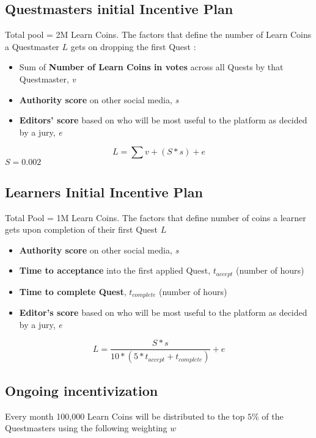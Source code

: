 \documentclass{article}
\begin{document}
    \subsection{Questmasters initial Incentive Plan}
      Total pool = 2M Learn Coins.
      The factors that define the number of Learn Coins a Questmaster \(L\) gets on dropping the first Quest :
      \begin{itemize}
        \item Sum of \textbf{Number of Learn Coins in votes} across all Quests by that Questmaster, \textit{v}
        \item \textbf{Authority score} on other social media, \textit{s}
        \item \textbf{Editors' score} based on who will be most useful to the platform as decided by a jury, \textit{e}
      \end{itemize} 
      \[
        L = \sum v + (S * s) + e
      \]
      \(S = 0.002\)

    \subsection{Learners Initial Incentive Plan}
      Total Pool = 1M Learn Coins. The factors that define number of coins a learner gets upon completion of their first Quest \(L\)
      \begin{itemize}
        \item \textbf{Authority score} on other social media, \textit{s}
        \item \textbf{Time to acceptance} into the first applied Quest, \(t_{accept}\) (number of hours)
        \item \textbf{Time to complete Quest}, \(t_{complete}\) (number of hours)
        \item \textbf{Editor's score} based on who will be most useful to the platform as decided by a jury, \textit{e}
      \end{itemize}
      \[
        L = \frac{S * s}{10 * (5*t_{accept} + t_{complete})} + e
      \]
    \subsection{Ongoing incentivization}
      Every month 100,000 Learn Coins will be distributed to the top \(5\%\) of the Questmasters using the following weighting \(w\) 
\end{document}

